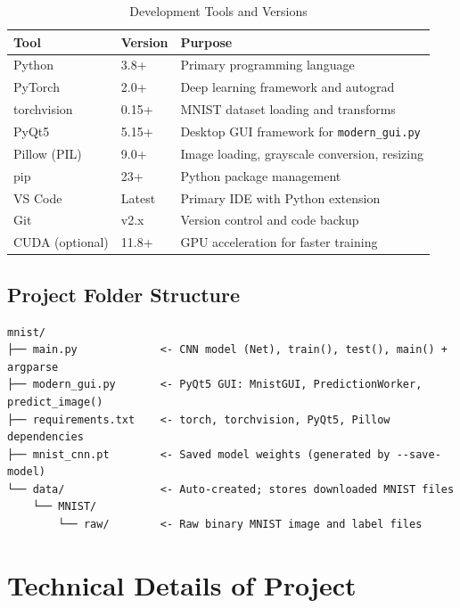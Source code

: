 \documentclass[12pt,a4paper,openany]{report}
\begin{document}
\begin{table}[H]
\centering
\begin{tabular}{|l|l|p{7cm}|}
\hline
\textbf{Tool}      & \textbf{Version}   & \textbf{Purpose} \\
\hline
Python             & 3.8+               & Primary programming language \\
PyTorch            & 2.0+               & Deep learning framework and autograd \\
torchvision        & 0.15+              & MNIST dataset loading and transforms \\
PyQt5              & 5.15+              & Desktop GUI framework for \texttt{modern\_gui.py} \\
Pillow (PIL)       & 9.0+               & Image loading, grayscale conversion, resizing \\
pip                & 23+                & Python package management \\
VS Code            & Latest             & Primary IDE with Python extension \\
Git                & v2.x               & Version control and code backup \\
CUDA (optional)    & 11.8+              & GPU acceleration for faster training \\
\hline
\end{tabular}
\caption{Development Tools and Versions}
\end{table}

\section{Project Folder Structure}

\begin{verbatim}
mnist/
├── main.py             <- CNN model (Net), train(), test(), main() + argparse
├── modern_gui.py       <- PyQt5 GUI: MnistGUI, PredictionWorker, predict_image()
├── requirements.txt    <- torch, torchvision, PyQt5, Pillow dependencies
├── mnist_cnn.pt        <- Saved model weights (generated by --save-model)
└── data/               <- Auto-created; stores downloaded MNIST files
    └── MNIST/
        └── raw/        <- Raw binary MNIST image and label files
\end{verbatim}

\chapter{Technical Details of Project}
\end{document}
